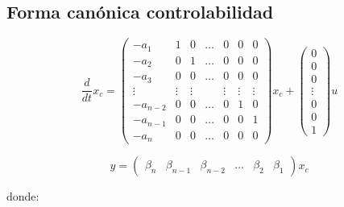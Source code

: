         \subsection{Forma canónica controlabilidad}

        \begin{equation}
            \frac{d}{dt} x_c =
            \begin{pmatrix}
            -a_{1} & 1 & 0 & \dots & 0 & 0 & 0 \\
            -a_{2} & 0 & 1 & \dots & 0 & 0 & 0 \\
            -a_{3} & 0 & 0 & \dots & 0 & 0 & 0 \\
            \vdots & \vdots & \vdots & & \vdots & \vdots & \vdots \\
            -a_{n-2} & 0 & 0 & \dots & 0 & 1 & 0 \\
            -a_{n-1} & 0 & 0 & \dots & 0 & 0 & 1 \\
            -a_{n} & 0 & 0 & \dots & 0 & 0 & 0
            \end{pmatrix} x_c +
            \begin{pmatrix}
            0 \\
            0 \\
            0 \\
            \vdots \\
            0 \\
            0 \\
            1
            \end{pmatrix} u
        \end{equation}

        \begin{equation}
            y =
            \begin{pmatrix}
                \beta_n & \beta_{n-1} & \beta_{n-2} & \dots & \beta_2 & \beta_1
            \end{pmatrix} x_c
        \end{equation}

        donde:

